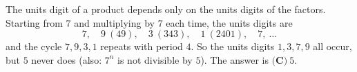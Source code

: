 The units digit of a product depends only on the units digits of the factors. Starting from $7$ and multiplying by $7$ each time, the units digits are
\[
7,\quad 9\ (49),\quad 3\ (343),\quad 1\ (2401),\quad 7,\ \dots
\]
and the cycle $7,9,3,1$ repeats with period $4$. So the units digits $1,3,7,9$ all occur, but $5$ never does (also: $7^n$ is not divisible by $5$). The answer is $\boxed{\textbf{(C)}\ 5}$.
